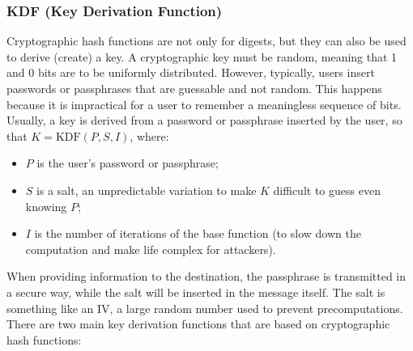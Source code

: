 \subsubsection{KDF (Key Derivation Function)}
Cryptographic hash functions are not only for digests, but they can also be used to derive (create) a key.
A cryptographic key must be random, meaning that 1 and 0 bits are to be uniformly distributed. However, typically, users insert passwords or passphrases that are guessable and not random. This happens because it is impractical for a user to remember a meaningless sequence of bits. Usually, a key is derived from a password or passphrase inserted by the user, so that \(K = \text{KDF}(P, S, I)\), where:
\begin{itemize}
	\item \(P\) is the user's password or passphrase;
	\item \(S\) is a salt, an unpredictable variation to make \(K\) difficult to guess even knowing \(P\);
	\item \(I\) is the number of iterations of the base function (to slow down the computation and make life complex for attackers).
\end{itemize}

When providing information to the destination, the passphrase is transmitted in a secure way, while the salt will be inserted in the message itself. The salt is something like an IV, a large random number used to prevent precomputations.
There are two main key derivation functions that are based on cryptographic hash functions:

